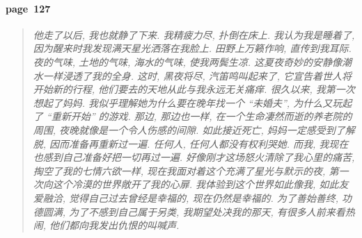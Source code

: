 \paragraph*{page~127}
\begin{quotation}
    \itshape
    他走了以后, 我也就静了下来. 我精疲力尽, 扑倒在床上. 我认为我是睡着了, 因为醒来时我发现满天星光洒落在我脸上. 田野上万籁作响, 直传到我耳际. 夜的气味, 土地的气味, 海水的气味, 使我两鬓生凉. 这夏夜奇妙的安静像潮水一样浸透了我的全身. 这时, 黑夜将尽, 汽笛鸣叫起来了, 它宣告着世人将开始新的行程, 他们要去的天地从此与我永远无关痛痒. 很久以来, 我第一次想起了妈妈. 我似乎理解她为什么要在晚年找一个 ``未婚夫'', 为什么又玩起了 ``重新开始'' 的游戏. 那边, 那边也一样, 在一个生命凄然而逝的养老院的周围, 夜晚就像是一个令人伤感的间隙. 如此接近死亡, 妈妈一定感受到了解脱, 因而准备再重新过一遍. 任何人, 任何人都没有权利哭她. 而我, 我现在也感到自己准备好把一切再过一遍. 好像刚才这场怒火清除了我心里的痛苦, 掏空了我的七情六欲一样, 现在我面对着这个充满了星光与默示的夜, 第一次向这个冷漠的世界敞开了我的心扉. 我体验到这个世界如此像我, 如此友爱融洽, 觉得自己过去曾经是幸福的, 现在仍然是幸福的. 为了善始善终, 功德圆满, 为了不感到自己属于另类, 我期望处决我的那天, 有很多人前来看热闹, 他们都向我发出仇恨的叫喊声. 
\end{quotation}
